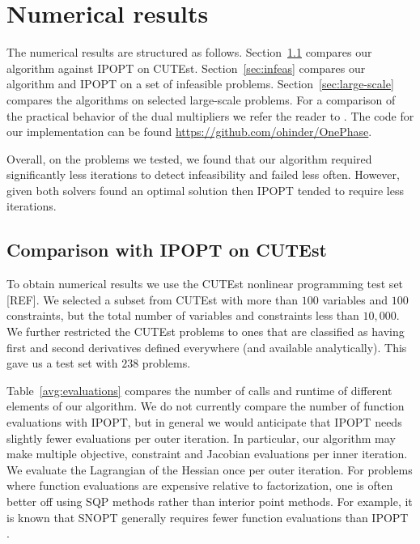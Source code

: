 \documentclass{article}
\begin{document}
\section{Numerical results}\label{sec:numerical-results}

 The numerical results are structured as follows. Section~\ref{alg:comparison-IPOPT} compares our algorithm against IPOPT on CUTEst. Section~\ref{sec:infeas} compares our algorithm and IPOPT on a set of infeasible problems. Section~\ref{sec:large-scale} compares the algorithms on selected large-scale problems. For a comparison of the practical behavior of the dual multipliers we refer the reader to \cite{haeser2017behavior}. The code for our implementation can be found \url{https://github.com/ohinder/OnePhase}.
 
 
Overall, on the problems we tested, we found that our algorithm required significantly less iterations to detect infeasibility and failed less often. However, given both solvers found an optimal solution then IPOPT tended to require less iterations.

 

\subsection{Comparison with IPOPT on CUTEst}\label{alg:comparison-IPOPT}

To obtain numerical results we use the CUTEst nonlinear programming test set [REF]. We selected a subset from CUTEst with more than $100$ variables and $100$ constraints, but the total number of variables and constraints less than $10,000$. We further restricted the CUTEst problems to ones that are classified as having first and second derivatives defined everywhere (and available analytically). This gave us a test set with $238$ problems.

Table~\ref{avg:evaluations} compares the number of calls and runtime of different elements of our algorithm. We do not currently compare the number of function evaluations with IPOPT, but in general we would anticipate that IPOPT needs slightly fewer evaluations per outer iteration. In particular, our algorithm may make multiple objective, constraint and Jacobian evaluations per inner iteration. We evaluate the Lagrangian of the Hessian once per outer iteration. For problems where function evaluations are expensive relative to factorization, one is often better off using SQP methods rather than interior point methods. For example, it is known that SNOPT generally requires fewer function evaluations than IPOPT \cite[Figure 2, Figure 3]{gill2015performance}. 
\end{document}
